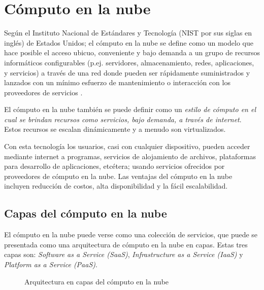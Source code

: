 \section{Cómputo en la nube}
\label{\detokenize{chapter_one/cloud_computing:computo-en-la-nube}}\label{\detokenize{chapter_one/cloud_computing::doc}}

\begin{remark}
Según el Instituto Nacional de Estándares y Tecnología (NIST por sus siglas en inglés) de Estados Unidos;
el cómputo en la
nube se define como un modelo que hace posible el acceso ubicuo, conveniente
y bajo demanda a un grupo de recursos informáticos configurables
(p.ej. servidores, almacenamiento, redes, aplicaciones, y servicios) a través
de una red donde pueden ser rápidamente suministrados y
lanzados con un mínimo esfuerzo de mantenimiento
o interacción con los proveedores de servicios \cite{borkofurhtarmandoescalante2010}.
\end{remark}


El cómputo en la nube también se puede definir como un \textit{estilo de cómputo en el cual
se brindan recursos como servicios, bajo demanda, a través de internet}.
Estos recursos se escalan dinámicamente y a menudo son virtualizados.

Con esta tecnología los usuarios, casi con cualquier dispositivo, pueden acceder mediante internet
a programas, servicios de alojamiento de archivos, plataformas para desarrollo de
aplicaciones, etcétera; usando servicios ofrecidos por
proveedores de cómputo en la nube. Las ventajas del cómputo en la nube incluyen
reducción de costos, alta disponibilidad y la fácil escalabilidad.


\subsection{Capas del cómputo en la nube}
\label{\detokenize{chapter_one/cloud_computing:capas-del-computo-en-la-nube}}
El cómputo en la nube puede verse como una colección de servicios, que puede se
presentada como una arquitectura de cómputo en la nube en capas. Estas
tres capas son: \textit{Software as a Service (SaaS)},
\textit{Infrastructure as a Service (IaaS)} y \textit{Platform as a Service (PaaS)}.

\begin{figure}[ht]
\centering
\capstart

\noindent{}
\caption{Arquitectura en capas del cómputo en la nube}\label{\detokenize{chapter_one/cloud_computing:c-c-layers}}\end{figure}


